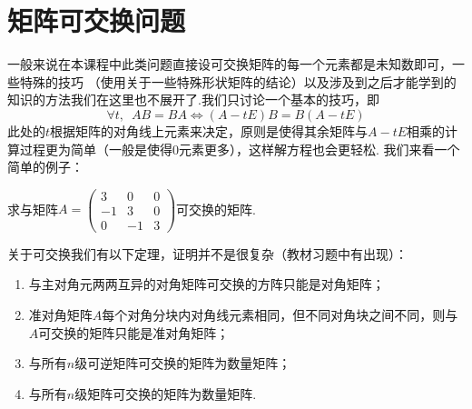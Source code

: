 \section{矩阵可交换问题}
一般来说在本课程中此类问题直接设可交换矩阵的每一个元素都是未知数即可，一些特殊的技巧
（使用关于一些特殊形状矩阵的结论）以及涉及到之后才能学到的知识的方法我们在这里也不展开了.我们只讨论一个基本的技巧，即
\[\forall t,\enspace AB=BA \iff (A-tE)B=B(A-tE)\]
此处的$t$根据矩阵的对角线上元素来决定，原则是使得其余矩阵与$A-tE$相乘的计算过程更为简单（一般是使得0元素更多），这样解方程也会更轻松.
我们来看一个简单的例子：
\begin{example}
    求与矩阵$A=\begin{pmatrix}
        3 & 0 & 0 \\ -1 & 3 & 0 \\ 0 & -1 & 3
    \end{pmatrix}$可交换的矩阵.
\end{example}

关于可交换我们有以下定理，证明并不是很复杂（教材习题中有出现）：
\begin{theorem}
    \begin{enumerate}
        \item 与主对角元两两互异的对角矩阵可交换的方阵只能是对角矩阵；

        \item 准对角矩阵$A$每个对角分块内对角线元素相同，但不同对角块之间不同，则与$A$可交换的矩阵只能是准对角矩阵；

        \item 与所有$n$级可逆矩阵可交换的矩阵为数量矩阵；

        \item 与所有$n$级矩阵可交换的矩阵为数量矩阵.
    \end{enumerate}
\end{theorem}

